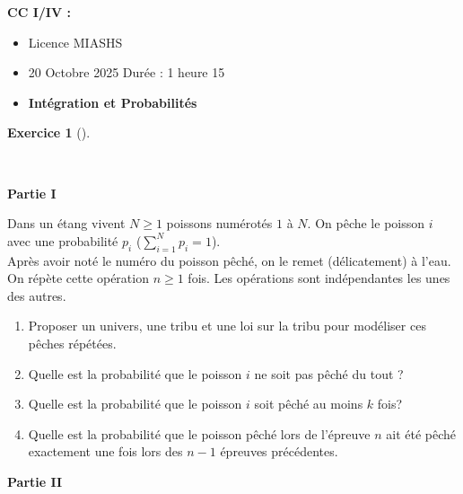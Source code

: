 \documentclass[
  french,
  11pt,
  a4paper,
  twoside,
  article,
  titlepage=false]{memoir}
\author{}
\date{2025-10-16}
\providecommand{\tightlist}{%
  \setlength{\itemsep}{0pt}\setlength{\parskip}{0pt}}
\theoremstyle{definition}
\newtheorem{exercise}{Exercice}[section]
\theoremstyle{remark}
\begin{document}
\frontmatter


\mainmatter
\begin{tcolorbox}[enhanced jigsaw, arc=.35mm, bottomrule=.15mm, breakable, colback=white, colframe=quarto-callout-note-color-frame, left=2mm, leftrule=.75mm, opacityback=0, rightrule=.15mm, toprule=.15mm]

\vspace{-3mm}\textbf{CC I/IV :}\vspace{3mm}

\begin{itemize}
\tightlist
\item
  Licence MIASHS
\item
  20 Octobre 2025 Durée : 1 heure 15
\item
  \textbf{Intégration et Probabilités}
\end{itemize}

\end{tcolorbox}

\begin{exercise}[]\protect\hypertarget{exr-1-a}{}\label{exr-1-a}

~

\end{exercise}

\textbf{Partie I}

Dans un étang vivent \(N\geqslant 1\) poissons numérotés \(1\) à \(N\).
On pêche le poisson \(i\) avec une probabilité \(p_i\)
(\(\sum_{i=1}^N  p_i=1\)).\\
Après avoir noté le numéro du poisson pêché, on le remet (délicatement)
à l'eau. On répète cette opération \(n\geq 1\) fois. Les opérations sont
indépendantes les unes des autres.

\begin{enumerate}
\def\labelenumi{\roman{enumi}.}
\tightlist
\item
  Proposer un univers, une tribu et une loi sur la tribu pour modéliser
  ces pêches répétées.
\item
  Quelle est la probabilité que le poisson \(i\) ne soit pas pêché du
  tout ?
\item
  Quelle est la probabilité que le poisson \(i\) soit pêché au moins
  \(k\) fois?
\item
  Quelle est la probabilité que le poisson pêché lors de l'épreuve \(n\)
  ait été pêché exactement une fois lors des \(n-1\) épreuves
  précédentes.
\end{enumerate}

\textbf{Partie II}
\end{document}

